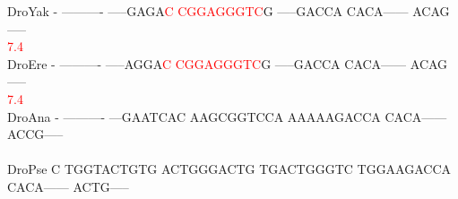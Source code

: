 \documentclass[11pt,twoside,reqno,a4paper]{article}
\begin{document}
{DroYak	-	----------	-----GAGA\textcolor{Red}{C}	\textcolor{Red}{C}\textcolor{Red}{G}\textcolor{Red}{G}\textcolor{Red}{A}\textcolor{Red}{G}\textcolor{Red}{G}\textcolor{Red}{G}\textcolor{Red}{T}\textcolor{Red}{C}G	-----GACCA	CACA------	ACAG-----\\
\hspace*{7\charwidth}\hspace*{1\charwidth}\hspace*{1\charwidth}\hspace*{20\charwidth}\textcolor{Red}{7.4}\hspace*{1\charwidth}\hspace*{1\charwidth}\hspace*{1\charwidth}\hspace*{1\charwidth}\\
DroEre	-	----------	-----AGGA\textcolor{Red}{C}	\textcolor{Red}{C}\textcolor{Red}{G}\textcolor{Red}{G}\textcolor{Red}{A}\textcolor{Red}{G}\textcolor{Red}{G}\textcolor{Red}{G}\textcolor{Red}{T}\textcolor{Red}{C}G	-----GACCA	CACA------	ACAG-----\\
\hspace*{7\charwidth}\hspace*{1\charwidth}\hspace*{1\charwidth}\hspace*{20\charwidth}\textcolor{Red}{7.4}\hspace*{1\charwidth}\hspace*{1\charwidth}\hspace*{1\charwidth}\hspace*{1\charwidth}\\
DroAna	-	----------	---GAATCAC	AAGCGGTCCA	AAAAAGACCA	CACA------	ACCG-----\\
\hspace*{7\charwidth}\hspace*{1\charwidth}\hspace*{1\charwidth}\hspace*{1\charwidth}\hspace*{1\charwidth}\hspace*{1\charwidth}\hspace*{1\charwidth}\\
DroPse	C	TGGTACTGTG	ACTGGGACTG	TGACTGGGTC	TGGAAGACCA	CACA------	ACTG-----\\
\hspace*{7\charwidth}\hspace*{1\charwidth}\hspace*{1\charwidth}\hspace*{1\charwidth}\hspace*{1\charwidth}\hspace*{1\charwidth}\hspace*{1\charwidth}\\
}
\end{document}
